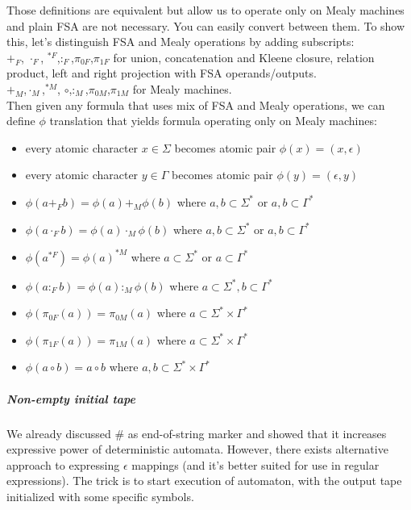 \documentclass[12pt]{article}
\begin{document}
Those definitions are equivalent but allow us to operate only on Mealy machines and plain FSA are not necessary. You can easily convert between them. To show this, let's distinguish FSA and Mealy operations by adding subscripts: \\
$+_F$, $\cdot_F$, $^{*F}$,$:_F$,$\pi_{0F}$,$\pi_{1F}$ for union, concatenation and Kleene closure, relation product, left and right projection with FSA operands/outputs.\\ 
$+_M$,$\cdot_M$,$^{*M}$, $\circ$,$:_M$,$\pi_{0M}$,$\pi_{1M}$ for Mealy machines. \\
Then given any formula that uses mix of FSA and Mealy operations, we can define $\phi$ translation that yields formula operating only on Mealy machines:
\begin{itemize}
	\item every atomic character $x\in\Sigma$ becomes atomic pair $\phi(x) = (x,\epsilon)$
	\item every atomic character $y\in\Gamma$ becomes atomic pair $\phi(y) = (\epsilon,y)$
	\item $\phi(a+_Fb) = \phi(a)+_M\phi(b)$ where $a,b\subset \Sigma^*$ or $a,b\subset \Gamma^*$
	\item $\phi(a\cdot_Fb) = \phi(a)\cdot_M\phi(b)$ where $a,b\subset \Sigma^*$ or $a,b\subset \Gamma^*$
	\item $\phi(a^{*F}) = \phi(a)^{*M}$ where $a\subset \Sigma^*$ or $a\subset \Gamma^*$
	\item $\phi(a:_Fb) = \phi(a):_M\phi(b)$ where $a\subset \Sigma^*,b\subset\Gamma^*$
    \item $\phi(\pi_{0F}(a)) = \pi_{0M}(a)$ where $a\subset \Sigma^* \times \Gamma^*$
    \item $\phi(\pi_{1F}(a)) = \pi_{1M}(a)$ where $a\subset \Sigma^* \times \Gamma^*$
    \item $\phi(a\circ b) = a\circ b$ where $a,b\subset \Sigma^* \times \Gamma^*$
\end{itemize} 





\subparagraph{Non-empty initial tape}
We already discussed $\#$ as end-of-string marker and showed that it increases expressive power of deterministic automata. However, there exists alternative approach to expressing $\epsilon$ mappings (and it's better suited for use in regular expressions). The trick is to start execution of automaton, with the output tape initialized with some specific symbols.
\end{document}

